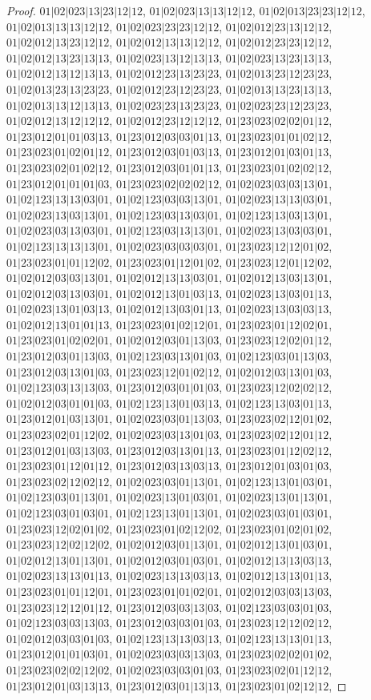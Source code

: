 \documentclass[12pt]{article}
\theoremstyle{plain}
\theoremstyle{definition}
\theoremstyle{remark}
\begin{document}
\begin{proof}
$01|02|023|13|23|12|12$, $01|02|023|13|13|12|12$, $01|02|013|23|23|12|12$, $01|02|013|13|13|12|12$, $01|02|023|23|23|12|12$, $01|02|012|23|13|12|12$, $01|02|012|13|23|12|12$, $01|02|012|13|13|12|12$, $01|02|012|23|23|12|12$, $01|02|012|13|23|13|13$, $01|02|023|13|12|13|13$, $01|02|023|13|23|13|13$, $01|02|012|13|12|13|13$, $01|02|012|23|13|23|23$, $01|02|013|23|12|23|23$, $01|02|013|23|13|23|23$, $01|02|012|23|12|23|23$, $01|02|013|13|23|13|13$, $01|02|013|13|12|13|13$, $01|02|023|23|13|23|23$, $01|02|023|23|12|23|23$, $01|02|012|13|12|12|12$, $01|02|012|23|12|12|12$, $01|23|023|02|02|01|12$, $01|23|012|01|01|03|13$, $01|23|012|03|03|01|13$, $01|23|023|01|01|02|12$, $01|23|023|01|02|01|12$, $01|23|012|03|01|03|13$, $01|23|012|01|03|01|13$, $01|23|023|02|01|02|12$, $01|23|012|03|01|01|13$, $01|23|023|01|02|02|12$, $01|23|012|01|01|01|03$, $01|23|023|02|02|02|12$, $01|02|023|03|03|13|01$, $01|02|123|13|13|03|01$, $01|02|123|03|03|13|01$, $01|02|023|13|13|03|01$, $01|02|023|13|03|13|01$, $01|02|123|03|13|03|01$, $01|02|123|13|03|13|01$, $01|02|023|03|13|03|01$, $01|02|123|03|13|13|01$, $01|02|023|13|03|03|01$, $01|02|123|13|13|13|01$, $01|02|023|03|03|03|01$, $01|23|023|12|12|01|02$, $01|23|023|01|01|12|02$, $01|23|023|01|12|01|02$, $01|23|023|12|01|12|02$, $01|02|012|03|03|13|01$, $01|02|012|13|13|03|01$, $01|02|012|13|03|13|01$, $01|02|012|03|13|03|01$, $01|02|012|13|01|03|13$, $01|02|023|13|03|01|13$, $01|02|023|13|01|03|13$, $01|02|012|13|03|01|13$, $01|02|023|13|03|03|13$, $01|02|012|13|01|01|13$, $01|23|023|01|02|12|01$, $01|23|023|01|12|02|01$, $01|23|023|01|02|02|01$, $01|02|012|03|01|13|03$, $01|23|023|12|02|01|12$, $01|23|012|03|01|13|03$, $01|02|123|03|13|01|03$, $01|02|123|03|01|13|03$, $01|23|012|03|13|01|03$, $01|23|023|12|01|02|12$, $01|02|012|03|13|01|03$, $01|02|123|03|13|13|03$, $01|23|012|03|01|01|03$, $01|23|023|12|02|02|12$, $01|02|012|03|01|01|03$, $01|02|123|13|01|03|13$, $01|02|123|13|03|01|13$, $01|23|012|01|03|13|01$, $01|02|023|03|01|13|03$, $01|23|023|02|12|01|02$, $01|23|023|02|01|12|02$, $01|02|023|03|13|01|03$, $01|23|023|02|12|01|12$, $01|23|012|01|03|13|03$, $01|23|012|03|13|01|13$, $01|23|023|01|12|02|12$, $01|23|023|01|12|01|12$, $01|23|012|03|13|03|13$, $01|23|012|01|03|01|03$, $01|23|023|02|12|02|12$, $01|02|023|03|01|13|01$, $01|02|123|13|01|03|01$, $01|02|123|03|01|13|01$, $01|02|023|13|01|03|01$, $01|02|023|13|01|13|01$, $01|02|123|03|01|03|01$, $01|02|123|13|01|13|01$, $01|02|023|03|01|03|01$, $01|23|023|12|02|01|02$, $01|23|023|01|02|12|02$, $01|23|023|01|02|01|02$, $01|23|023|12|02|12|02$, $01|02|012|03|01|13|01$, $01|02|012|13|01|03|01$, $01|02|012|13|01|13|01$, $01|02|012|03|01|03|01$, $01|02|012|13|13|03|13$, $01|02|023|13|13|01|13$, $01|02|023|13|13|03|13$, $01|02|012|13|13|01|13$, $01|23|023|01|01|12|01$, $01|23|023|01|01|02|01$, $01|02|012|03|03|13|03$, $01|23|023|12|12|01|12$, $01|23|012|03|03|13|03$, $01|02|123|03|03|01|03$, $01|02|123|03|03|13|03$, $01|23|012|03|03|01|03$, $01|23|023|12|12|02|12$, $01|02|012|03|03|01|03$, $01|02|123|13|13|03|13$, $01|02|123|13|13|01|13$, $01|23|012|01|01|03|01$, $01|02|023|03|03|13|03$, $01|23|023|02|02|01|02$, $01|23|023|02|02|12|02$, $01|02|023|03|03|01|03$, $01|23|023|02|01|12|12$, $01|23|012|01|03|13|13$, $01|23|012|03|01|13|13$, $01|23|023|01|02|12|12$, 
\end{proof}
\end{document}
